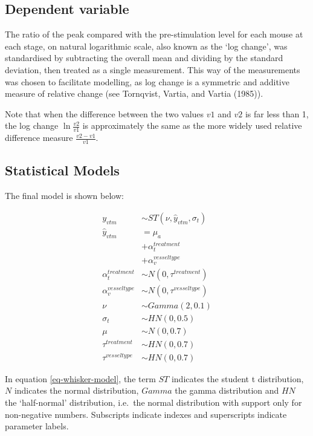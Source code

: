 \documentclass[
  letterpaper,
  DIV=11,
  numbers=noendperiod,
  oneside]{scrartcl}
\theoremstyle{plain}
\theoremstyle{remark}
\begin{document}
\subsection{Dependent variable}\label{dependent-variable}

The ratio of the peak compared with the pre-stimulation level for each
mouse at each stage, on natural logarithmic scale, also known as the
`log change', was standardised by subtracting the overall mean and
dividing by the standard deviation, then treated as a single
measurement. This way of the measurements was chosen to facilitate
modelling, as log change is a symmetric and additive measure of relative
change (see Tornqvist, Vartia, and Vartia (1985)).

Note that when the difference between the two values \(v1\) and \(v2\)
is far less than 1, the log change \(\ln{\frac{v2}{v1}}\) is
approximately the same as the more widely used relative difference
measure \(\frac{v2-v1}{v1}\).

\subsection{Statistical Models}\label{statistical-models}

The final model is shown below:

\begin{align}
y_{vtm} &\sim ST(\nu, \hat{y}_{vtm}, \sigma_{t}) \label{eq-whisker-model} \\
\hat{y}_{vtm} &= \mu_a \nonumber \\
  &+ \alpha^{treatment}_{t} \nonumber \\
  &+ \alpha^{vesseltype}_v \nonumber \\
\alpha^{treatment}_t &\sim N(0, \tau^{treatment}) \nonumber \\
\alpha^{vesseltype}_v &\sim N(0, \tau^{vesseltype}) \nonumber \\
\nu &\sim Gamma(2, 0.1) \nonumber \\
\sigma_t &\sim HN(0, 0.5) \nonumber \\
\mu &\sim N(0, 0.7) \nonumber \\
\tau^{treatment} &\sim HN(0, 0.7) \nonumber \\
\tau^{vesseltype} &\sim HN(0, 0.7) \nonumber
\end{align}

In equation \eqref{eq-whisker-model}, the term \(ST\) indicates the
student t distribution, \(N\) indicates the normal distribution,
\(Gamma\) the gamma distribution and \(HN\) the `half-normal'
distribution, i.e.~the normal distribution with support only for
non-negative numbers. Subscripts indicate indexes and superscripts
indicate parameter labels.
\end{document}

